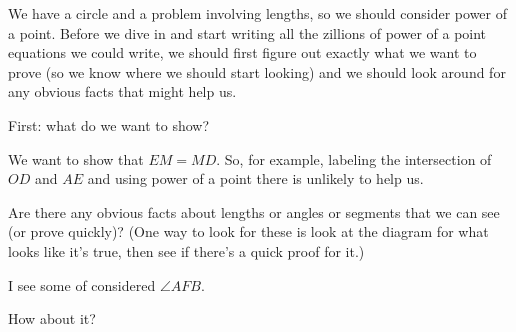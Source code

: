 We have a circle and a problem involving lengths, so we should consider power of a point. Before we dive in and start writing all the zillions of power of a point equations we could write, we should first figure out exactly what we want to prove (so we know where we should start looking) and we should look around for any obvious facts that might help us.

First: what do we want to show?











We want to show that $EM = MD.$  So, for example, labeling the intersection of $OD$ and $AE$ and using power of a point there is unlikely to help us.

Are there any obvious facts about lengths or angles or segments that we can see (or prove quickly)?  (One way to look for these is look at the diagram for what looks like it's true, then see if there's a quick proof for it.)

I see some of considered $\angle AFB$.

How about it?




